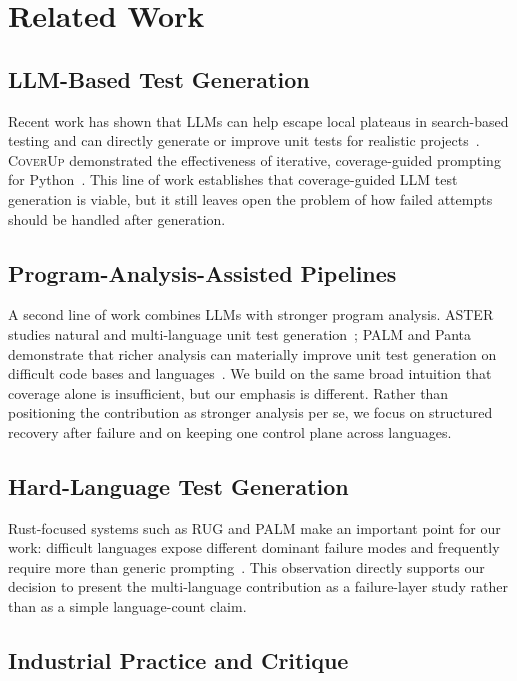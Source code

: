 \documentclass[10pt]{article}
\begin{document}
\section{Related Work}
\label{sec:related}

\subsection{LLM-Based Test Generation}

Recent work has shown that LLMs can help escape local plateaus in search-based testing and can directly generate or improve unit tests for realistic projects~\cite{lemieux2023codamosa,alshahwan2024testgenllm}. \textsc{CoverUp} demonstrated the effectiveness of iterative, coverage-guided prompting for Python~\cite{pizzorno2025coverup}. This line of work establishes that coverage-guided LLM test generation is viable, but it still leaves open the problem of how failed attempts should be handled after generation.

\subsection{Program-Analysis-Assisted Pipelines}

A second line of work combines LLMs with stronger program analysis. ASTER studies natural and multi-language unit test generation~\cite{pan2024aster}; PALM and Panta demonstrate that richer analysis can materially improve unit test generation on difficult code bases and languages~\cite{chu2025palm,gu2025panta}. We build on the same broad intuition that coverage alone is insufficient, but our emphasis is different. Rather than positioning the contribution as stronger analysis per se, we focus on structured recovery after failure and on keeping one control plane across languages.

\subsection{Hard-Language Test Generation}

Rust-focused systems such as RUG and PALM make an important point for our work: difficult languages expose different dominant failure modes and frequently require more than generic prompting~\cite{cheng2025rug,chu2025palm}. This observation directly supports our decision to present the multi-language contribution as a failure-layer study rather than as a simple language-count claim.

\subsection{Industrial Practice and Critique}
\end{document}
